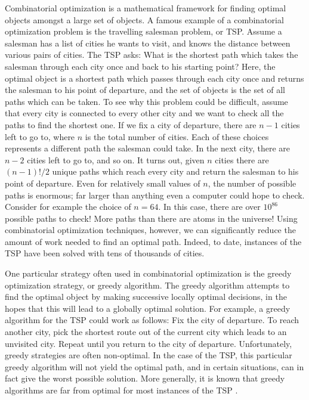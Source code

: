 \documentclass[a4paper,11pt]{report}
\theoremstyle{plain}
\theoremstyle{definition}
\begin{document}
Combinatorial optimization is a mathematical framework for finding optimal
objects amongst a large set of objects. A famous example of a combinatorial
optimization problem is the travelling salesman problem, or TSP\@. Assume a
salesman has a list of cities he wants to visit, and knows the distance between
various pairs of cities. The TSP asks: What is the shortest path which takes
the salesman through each city once and back to his starting point? Here, the
optimal object is a shortest path which passes through each city once and
returns the salesman to his point of departure, and the set of objects is the
set of all paths which can be taken. To see why this problem could be
difficult, assume that every city is connected to every other city and we want
to check all the paths to find the shortest one. If we fix a city of departure,
there are $n-1$ cities left to go to, where $n$ is the total number of cities.
Each of these choices represents a different path the salesman could take. In
the next city, there are $n-2$ cities left to go to, and so on. It turns out,
given $n$ cities there are $(n-1)!/2$ unique paths which reach every city and
return the salesman to his point of departure. Even for relatively small values
of $n$, the number of possible paths is enormous; far larger than anything even
a computer could hope to check. Consider for example the choice of $n = 64$. In
this case, there are over $10^{86}$ possible paths to check! More paths than
there are atoms in the universe! Using combinatorial optimization techniques,
however, we can significantly reduce the amount of work needed to find an
optimal path.  Indeed, to date, instances of the TSP have been solved with tens
of thousands of cities.

One particular strategy often used in combinatorial optimization is the greedy
optimization strategy, or greedy algorithm. The greedy algorithm attempts to
find the optimal object by making successive locally optimal decisions, in the
hopes that this will lead to a globally optimal solution. For example, a greedy
algorithm for the TSP could work as follows: Fix the city of departure.  To
reach another city, pick the shortest route out of the current city which leads
to an unvisited city. Repeat until you return to the city of departure.
Unfortunately, greedy strategies are often non-optimal. In the case of the TSP,
this particular greedy algorithm will not yield the optimal path, and in
certain situations, can in fact give the worst possible solution. More
generally, it is known that greedy algorithms are far from optimal for most
instances of the TSP \cite{greedy-tsp}.
\end{document}
